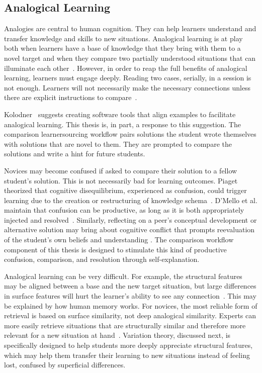 \subsection{Analogical Learning}

Analogies are central to human cognition. They can help learners understand and transfer knowledge and skills to new situations. Analogical learning is at play both when learners have a base of knowledge that they bring with them to a novel target and when they compare two partially understood situations that can illuminate each other~\cite{kurtz01learning,loewenstein2003analogical}. However, in order to reap the full benefits of analogical learning, learners must engage deeply. Reading two cases, serially, in a session is not enough. Learners will not necessarily make the necessary connections unless there are explicit instructions to compare~\cite{loewenstein2003analogical,catrambone1989overcoming}. 

Kolodner~\cite{Kolodner} suggests creating software tools that align examples to facilitate analogical learning. This thesis is, in part, a response to this suggestion. The comparison learnersourcing workflow pairs solutions the student wrote themselves with solutions that are novel to them. They are prompted to compare the solutions and write a hint for future students.

Novices may become confused if asked to compare their solution to a fellow student's solution. This is not necessarily bad for learning outcomes. Piaget theorized that cognitive disequilibrium, experienced as confusion, could trigger learning due to the creation or restructuring of knowledge schema~\cite{disequilibrium}. D'Mello et al. maintain that confusion can be productive, as long as it is both appropriately injected and resolved~\cite{productiveconfusion}. Similarly, reflecting on a peer's conceptual development or alternative solution may bring about cognitive conflict that prompts reevaluation of the student's own beliefs and understanding \cite{kavanagh}. The comparison workflow component of this thesis is designed to stimulate this kind of productive confusion, comparison, and resolution through self-explanation. %

Analogical learning can be very difficult. For example, the structural features may be aligned between a base and the new target situation, but large differences in surface features will hurt the learner's ability to see any connection~\cite{Kurtz}. This may be explained by how human memory works. For novices, the most reliable form of retrieval is based on surface similarity, not deep analogical similarity. Experts can more easily retrieve situations that are structurally similar and therefore more relevant for a new situation at hand~\cite{Loewenstein}. Variation theory, discussed next, is specifically designed to help students more deeply appreciate structural features, which may help them transfer their learning to new situations instead of feeling lost, confused by superficial differences.

